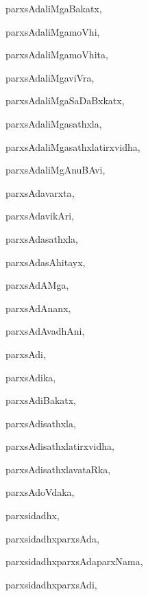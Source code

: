 \begin{multicols}{3}
{\noindent
{parxsAdaliMgaBakatx}, \pageref{parxsAdaliMgaBakatx}

\noindent
{parxsAdaliMgamoVhi}, \pageref{parxsAdaliMgamoVhi}

\noindent
{parxsAdaliMgamoVhita}, \pageref{parxsAdaliMgamoVhita}

\noindent
{parxsAdaliMgaviVra}, \pageref{parxsAdaliMgaviVra}

\noindent
{parxsAdaliMgaSaDaBxkatx}, \pageref{parxsAdaliMgaSaDaBxkatx}

\noindent
{parxsAdaliMgasathxla}, \pageref{parxsAdaliMgasathxla}

\noindent
{parxsAdaliMgasathxlatirxvidha}, \pageref{parxsAdaliMgasathxlatirxvidha}

\noindent
{parxsAdaliMgAnuBAvi}, \pageref{parxsAdaliMgAnuBAvi}

\noindent
{parxsAdavarxta}, \pageref{parxsAdavarxta}

\noindent
{parxsAdavikAri}, \pageref{parxsAdavikAri2}

\noindent
{parxsAdasathxla}, \pageref{parxsAdasathxla}

\noindent
{parxsAdasAhitayx}, \pageref{parxsAdasAhitayx}

\noindent
{parxsAdAMga}, \pageref{parxsAdAMga}

\noindent
{parxsAdAnanx}, \pageref{parxsAdAnanx}

\noindent
{parxsAdAvadhAni}, \pageref{parxsAdAvadhAni}

\noindent
{parxsAdi}, \pageref{parxsAdi}

\noindent
{parxsAdika}, \pageref{parxsAdika}

\noindent
{parxsAdiBakatx}, \pageref{parxsAdiBakatx}

\noindent
{parxsAdisathxla}, \pageref{parxsAdisathxla}

\noindent
{parxsAdisathxlatirxvidha}, \pageref{parxsAdisathxlatirxvidha}

\noindent
{parxsAdisathxlavataRka}, \pageref{parxsAdisathxlavataRka}

\noindent
{parxsAdoVdaka}, \pageref{parxsAdoVdaka}

\noindent
{parxsidadhx}, \pageref{parxsidadhx}

\noindent
{parxsidadhxparxsAda}, \pageref{parxsidadhxparxsAda}

\noindent
{parxsidadhxparxsAdaparxNama}, \pageref{parxsidadhxparxsAdaparxNama}

\noindent
{parxsidadhxparxsAdi}, \pageref{parxsidadhxparxsAdi}

}
\end{multicols}
